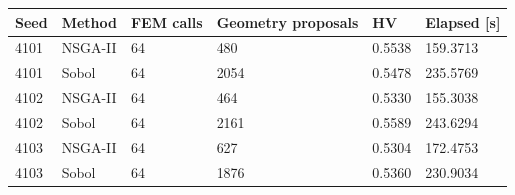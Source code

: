 \begin{tabular}{llllll}
\toprule
Seed & Method & FEM calls & Geometry proposals & HV & Elapsed [s] \\
\midrule
4101 & NSGA-II & 64 & 480 & 0.5538 & 159.3713 \\
4101 & Sobol & 64 & 2054 & 0.5478 & 235.5769 \\
4102 & NSGA-II & 64 & 464 & 0.5330 & 155.3038 \\
4102 & Sobol & 64 & 2161 & 0.5589 & 243.6294 \\
4103 & NSGA-II & 64 & 627 & 0.5304 & 172.4753 \\
4103 & Sobol & 64 & 1876 & 0.5360 & 230.9034 \\
\bottomrule
\end{tabular}

